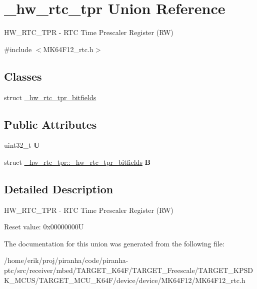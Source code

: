 \hypertarget{union__hw__rtc__tpr}{}\section{\+\_\+hw\+\_\+rtc\+\_\+tpr Union Reference}
\label{union__hw__rtc__tpr}


H\+W\+\_\+\+R\+T\+C\+\_\+\+T\+PR -\/ R\+TC Time Prescaler Register (RW)  




{\ttfamily \#include $<$M\+K64\+F12\+\_\+rtc.\+h$>$}

\subsection*{Classes}
\begin{DoxyCompactItemize}
\item 
struct \hyperlink{struct__hw__rtc__tpr_1_1__hw__rtc__tpr__bitfields}{\+\_\+hw\+\_\+rtc\+\_\+tpr\+\_\+bitfields}
\end{DoxyCompactItemize}
\subsection*{Public Attributes}
\begin{DoxyCompactItemize}
\item 
uint32\+\_\+t {\bfseries U}\hypertarget{union__hw__rtc__tpr_ae18159b2391ef7e656da2bb467c6c1ad}{}\label{union__hw__rtc__tpr_ae18159b2391ef7e656da2bb467c6c1ad}

\item 
struct \hyperlink{struct__hw__rtc__tpr_1_1__hw__rtc__tpr__bitfields}{\+\_\+hw\+\_\+rtc\+\_\+tpr\+::\+\_\+hw\+\_\+rtc\+\_\+tpr\+\_\+bitfields} {\bfseries B}\hypertarget{union__hw__rtc__tpr_a3cb63a01b78e4ad4d648e3c6c3d04df2}{}\label{union__hw__rtc__tpr_a3cb63a01b78e4ad4d648e3c6c3d04df2}

\end{DoxyCompactItemize}


\subsection{Detailed Description}
H\+W\+\_\+\+R\+T\+C\+\_\+\+T\+PR -\/ R\+TC Time Prescaler Register (RW) 

Reset value\+: 0x00000000U 

The documentation for this union was generated from the following file\+:\begin{DoxyCompactItemize}
\item 
/home/erik/proj/piranha/code/piranha-\/ptc/src/receiver/mbed/\+T\+A\+R\+G\+E\+T\+\_\+\+K64\+F/\+T\+A\+R\+G\+E\+T\+\_\+\+Freescale/\+T\+A\+R\+G\+E\+T\+\_\+\+K\+P\+S\+D\+K\+\_\+\+M\+C\+U\+S/\+T\+A\+R\+G\+E\+T\+\_\+\+M\+C\+U\+\_\+\+K64\+F/device/device/\+M\+K64\+F12/M\+K64\+F12\+\_\+rtc.\+h\end{DoxyCompactItemize}
